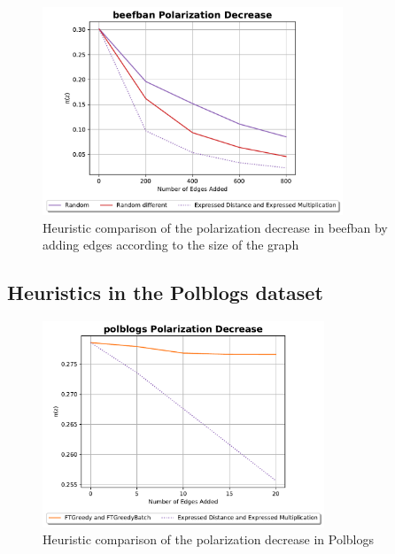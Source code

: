 \begin{figure}[!htbp]
	\centering
	\captionsetup{justification=centering,margin=2cm}
	\includegraphics[width=0.8\textwidth]{Figures/beefban Polarization Decrease big}
	\caption{Heuristic comparison of the polarization decrease in beefban by adding edges according to the size of the graph }
	\label{fig:beefban_big_pol}
\end{figure}

\clearpage


\subsection{Heuristics in the Polblogs dataset}

\begin{figure}[!htbp]
	\centering
	\captionsetup{justification=centering,margin=2cm}
	\includegraphics[width=0.75\textwidth]{Figures/polblogs Polarization Decrease}
	\caption{Heuristic comparison of the polarization decrease in Polblogs}
	\label{fig:polblogs_pol}
\end{figure}


